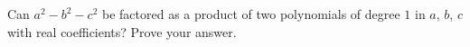 Can $a^2-b^2-c^2$ be factored as a product of two polynomials of degree $1$ in $a$, $b$, $c$ with real coefficients? Prove your answer.
